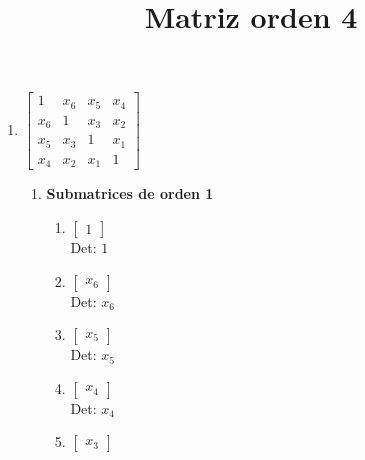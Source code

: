 \documentclass[12pt]{article}
\begin{document}
\title{Matriz orden 4}
\maketitle


\begin{enumerate}
\item $\left[\begin{matrix}1 & x_{6} & x_{5} & x_{4}\\x_{6} & 1 & x_{3} & x_{2}\\x_{5} & x_{3} & 1 & x_{1}\\x_{4} & x_{2} & x_{1} & 1\end{matrix}\right]$\\

\begin{enumerate}

\item {\bf Submatrices de orden 1}\\

\begin{enumerate}


\item $\displaystyle \left[\begin{matrix}1\end{matrix}\right]$\\

Det: $1$\\


\item $\displaystyle \left[\begin{matrix}x_{6}\end{matrix}\right]$\\

Det: $x_{6}$\\


\item $\displaystyle \left[\begin{matrix}x_{5}\end{matrix}\right]$\\

Det: $x_{5}$\\


\item $\displaystyle \left[\begin{matrix}x_{4}\end{matrix}\right]$\\

Det: $x_{4}$\\


\item $\displaystyle \left[\begin{matrix}x_{3}\end{matrix}\right]$\\


\end{enumerate}
\end{enumerate}
\end{enumerate}
\end{document}
